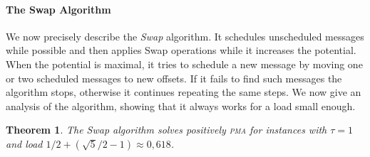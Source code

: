 \documentclass[10pt, conference, letterpaper]{IEEEtran}
\newtheorem{theorem}{Theorem}
\newcommand\pma{\textsc{pma}\xspace}
\begin{document}
\paragraph{The Swap Algorithm}


We now precisely describe the \emph{Swap} algorithm. It schedules unscheduled messages while possible and then applies Swap operations while it increases the potential. When the potential is maximal, it tries to schedule a new message by moving one or two scheduled messages to new offsets. If it fails to find such messages the algorithm stops, otherwise 
it continues repeating the same steps. We now give an analysis of the algorithm, showing that it always works for a load small enough.

\begin{theorem}
The Swap algorithm solves positively \pma for instances with $\tau =1$ and load $1/2 + (\sqrt{5}/2 -1) \approx 0,618$.
\end{theorem}
\end{document}

